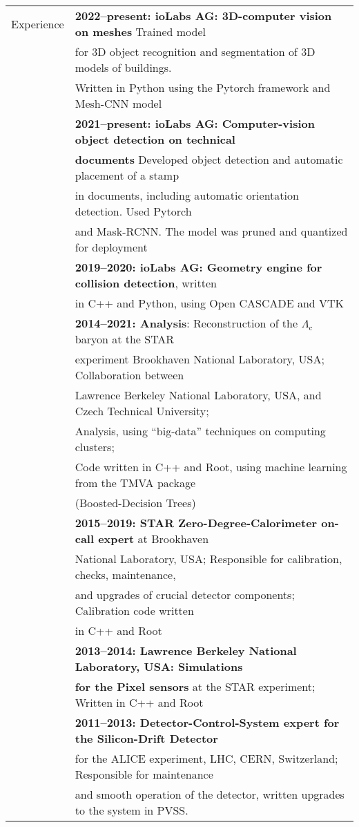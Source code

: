 \documentclass[a4paper,11pt,oneside]{article}
\begin{document}
\begin{tabular}{@{} l l}
  \Large{Experience} & \textbf{2022--present: ioLabs AG: 3D-computer vision on meshes} Trained model \\
     & for 3D object recognition and segmentation of 3D models of buildings. \\
     & Written in Python using the Pytorch framework and Mesh-CNN model\\[.3cm]
     & \textbf{2021--present: ioLabs AG: Computer-vision object detection on technical} \\ 
     & \textbf{documents} Developed object detection and automatic placement of a stamp \\
     & in documents, including automatic orientation detection. Used Pytorch  \\
     & and Mask-RCNN\@. The model was pruned and quantized for deployment\\[.3cm]
     & \textbf{2019--2020: ioLabs AG: Geometry engine for collision detection}, written\\
     &  in C++ and Python, using Open CASCADE and VTK\\[.3cm]
     & \textbf{2014--2021: Analysis}: Reconstruction of the $\Lambda_\mathrm{c}$ baryon  at the STAR \\
     & experiment Brookhaven National Laboratory, USA; Collaboration between \\
     &  Lawrence Berkeley National Laboratory, USA, and Czech Technical University;\\
     & Analysis, using ``big-data'' techniques on computing clusters; \\
     & Code written in C++ and Root, using machine learning from the TMVA package \\
     & (Boosted-Decision Trees)\\[.3cm]
     & \textbf{2015--2019: STAR Zero-Degree-Calorimeter on-call expert} at Brookhaven \\ 
     & National Laboratory, USA\@; Responsible for calibration, checks, maintenance, \\
     & and upgrades of crucial detector components; Calibration code written \\
     & in C++ and Root \\[.3cm]
     & \textbf{2013--2014: Lawrence Berkeley National Laboratory, USA\@: Simulations } \\ 
     & \textbf{for the Pixel sensors} at the STAR experiment; Written in C++ and Root\\[.3cm]
     & \textbf{2011--2013: Detector-Control-System expert for the Silicon-Drift Detector} \\
     & for the ALICE experiment, LHC, CERN, Switzerland; Responsible for maintenance \\
     & and smooth operation of the detector, written upgrades to the system in PVSS. \\
    

\end{tabular}
\end{document}
